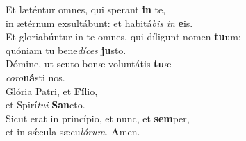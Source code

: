 \oddverse Et læténtur omnes, qui sperant \textbf{in} te,~\*\\
\oddverse in ætérnum exsultábunt: et habitá\textit{bis} \textit{in} \textbf{e}is.\\
\evenverse Et gloriabúntur in te omnes, qui díligunt nomen \textbf{tu}um:~\*\\
\evenverse quóniam tu bene\textit{dí}\textit{ces} \textbf{ju}sto.\\
\oddverse Dómine, ut scuto bonæ voluntátis \textbf{tu}æ~\*\\
\oddverse \textit{co}\textit{ro}\textbf{ná}sti nos.\\
\evenverse Glória Patri, et \textbf{Fí}lio,~\*\\
\evenverse et Spirí\textit{tu}\textit{i} \textbf{San}cto.\\
\oddverse Sicut erat in princípio, et nunc, et \textbf{sem}per,~\*\\
\oddverse et in sǽcula sæcu\textit{ló}\textit{rum}. \textbf{A}men.\\
